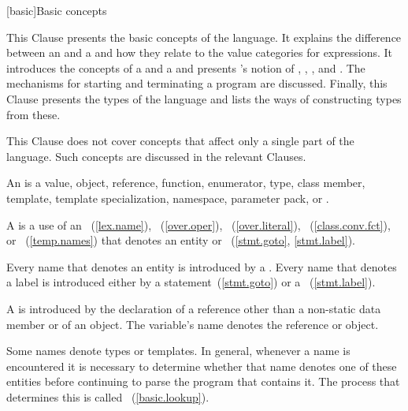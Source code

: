 [basic]{Basic concepts}


\pnum
\enternote This Clause presents the basic concepts of the \Cpp language.
It explains the difference between an  and a
 and how they relate to the value categories for expressions.
It introduces the concepts of a
 and a  and presents \Cpp's
notion of , , , and
 . The mechanisms for starting and
terminating a program are discussed. Finally, this Clause presents the
 types of the language and lists the ways of constructing
 types from these.\exitnote

\pnum
\enternote This Clause does not cover concepts that affect only a single
part of the language. Such concepts are discussed in the relevant
Clauses. \exitnote

\pnum
{}%
%
%
%
%
%
%
%
%
An  is a value, object, reference, function, enumerator, type,
class member, template, template specialization, namespace, parameter
pack, or .

\pnum
A  is a use of an ~(\ref{lex.name}),
~(\ref{over.oper}),
~(\ref{over.literal}),
~(\ref{class.conv.fct}), or
~(\ref{temp.names}) that denotes an entity or
~(\ref{stmt.goto}, \ref{stmt.label}).

\pnum
Every name that denotes an entity is introduced by a
. Every name that denotes a label is introduced
either by a  statement~(\ref{stmt.goto}) or a
~(\ref{stmt.label}).

\pnum
A  is introduced by the
declaration of
a reference other than a non-static data member or of
an object. The variable's name denotes the reference or object.

\pnum
Some names denote types or templates. In general,
whenever a name is encountered it is necessary to determine whether that name denotes
one of these entities before continuing to parse the program that contains it. The
process that determines this is called
%
~(\ref{basic.lookup}).


